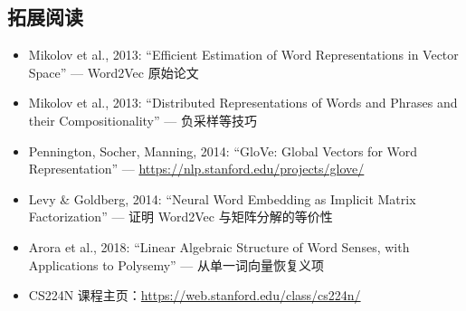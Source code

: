 \documentclass[a4paper]{article}
\begin{document}
\subsection{拓展阅读}

\begin{itemize}
    \item Mikolov et al., 2013: ``Efficient Estimation of Word Representations in Vector Space'' — Word2Vec 原始论文
    \item Mikolov et al., 2013: ``Distributed Representations of Words and Phrases and their Compositionality'' — 负采样等技巧
    \item Pennington, Socher, Manning, 2014: ``GloVe: Global Vectors for Word Representation'' — \url{https://nlp.stanford.edu/projects/glove/}
    \item Levy \& Goldberg, 2014: ``Neural Word Embedding as Implicit Matrix Factorization'' — 证明 Word2Vec 与矩阵分解的等价性
    \item Arora et al., 2018: ``Linear Algebraic Structure of Word Senses, with Applications to Polysemy'' — 从单一词向量恢复义项
    \item CS224N 课程主页：\url{https://web.stanford.edu/class/cs224n/}
\end{itemize}
\end{document}
